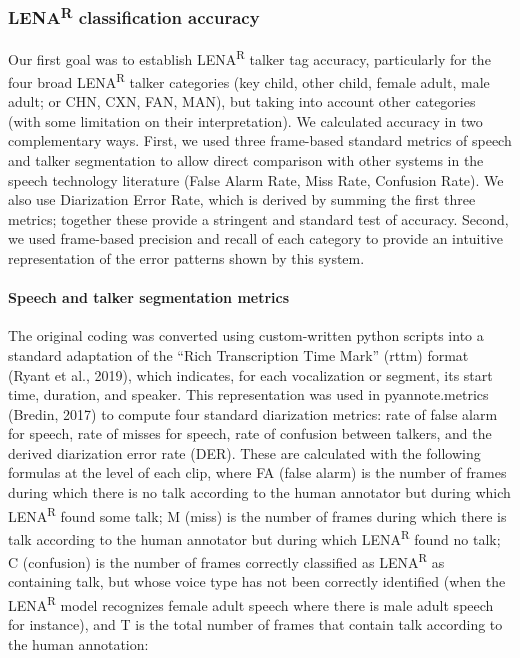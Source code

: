 \documentclass[english,table,man,floatsintext]{apa6}
\let\oldparagraph\paragraph
\renewcommand{\paragraph}[1]{\oldparagraph{#1}\mbox{}}
\begin{document}
\hypertarget{lenar-classification-accuracy}{%
\subsubsection{\texorpdfstring{LENA\textsuperscript{R} classification accuracy}{LENAR classification accuracy}}\label{lenar-classification-accuracy}}

Our first goal was to establish LENA\textsuperscript{R} talker tag accuracy, particularly for the four broad LENA\textsuperscript{R} talker categories (key child, other child, female adult, male adult; or CHN, CXN, FAN, MAN), but taking into account other categories (with some limitation on their interpretation). We calculated accuracy in two complementary ways. First, we used three frame-based standard metrics of speech and talker segmentation to allow direct comparison with other systems in the speech technology literature (False Alarm Rate, Miss Rate, Confusion Rate). We also use Diarization Error Rate, which is derived by summing the first three metrics; together these provide a stringent and standard test of accuracy. Second, we used frame-based precision and recall of each category to provide an intuitive representation of the error patterns shown by this system.

\hypertarget{speech-and-talker-segmentation-metrics}{%
\paragraph{Speech and talker segmentation metrics}\label{speech-and-talker-segmentation-metrics}}

The original coding was converted using custom-written python scripts into a standard adaptation of the \enquote{Rich Transcription Time Mark} (rttm) format (Ryant et al., 2019), which indicates, for each vocalization or segment, its start time, duration, and speaker. This representation was used in pyannote.metrics (Bredin, 2017) to compute four standard diarization metrics: rate of false alarm for speech, rate of misses for speech, rate of confusion between talkers, and the derived diarization error rate (DER). These are calculated with the following formulas at the level of each clip, where FA (false alarm) is the number of frames during which there is no talk according to the human annotator but during which LENA\textsuperscript{R} found some talk; M (miss) is the number of frames during which there is talk according to the human annotator but during which LENA\textsuperscript{R} found no talk; C (confusion) is the number of frames correctly classified as LENA\textsuperscript{R} as containing talk, but whose voice type has not been correctly identified (when the LENA\textsuperscript{R} model recognizes female adult speech where there is male adult speech for instance), and T is the total number of frames that contain talk according to the human annotation:
\end{document}
